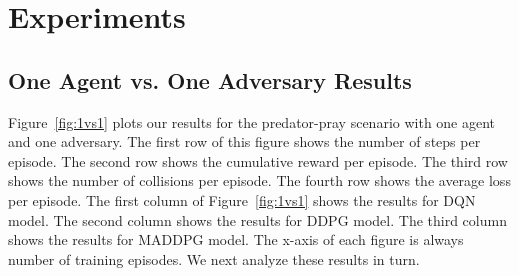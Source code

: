 
\section{Experiments}
\label{sec:experiment}

\subsection{One Agent vs. One Adversary Results}
\label{sec:experiment:1vs1}

Figure~\ref{fig:1vs1} plots our results for the predator-pray scenario with one
agent and one adversary. The first row of this figure shows the number of steps
per episode. The second row shows the cumulative reward per episode. The third
row shows the number of collisions per episode. The fourth row shows the
average loss per episode. The first column of Figure~\ref{fig:1vs1} shows the
results for DQN model. The second column shows the results for DDPG model. The
third column shows the results for MADDPG model. The x-axis of each figure is
always number of training episodes. We next analyze these results in turn.


